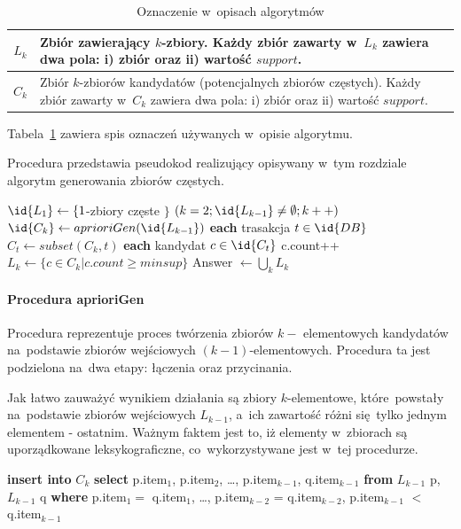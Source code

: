 \begin{table}
	\centering
	\begin{tabular}{c|p{7.7cm}}
	$L_k$ & Zbiór zawierający $k$-zbiory. Każdy zbiór zawarty w~$L_k$ zawiera dwa pola: i) zbiór oraz ii) wartość $support$. \\ \hline
	$C_k$ & Zbiór $k$-zbiorów kandydatów (potencjalnych zbiorów częstych). Każdy zbiór zawarty w~$C_k$ zawiera dwa pola: i) zbiór oraz ii) wartość $support$. \\ 
	\end{tabular}
	\caption{Oznaczenie w~opisach algorytmów\label{skroty:znaczanie}}
\end{table}

Tabela~\ref{skroty:znaczanie} zawiera spis oznaczeń używanych w~opisie algorytmu. 

Procedura  przedstawia pseudokod realizujący opisywany w~tym rozdziale algorytm generowania zbiorów częstych.

\begin{codebox}
	\label{apriori:listing}
	\li $\id{L_1} \gets \lbrace 1$-zbiory częste $\rbrace$
		\li \For $(k = 2; \id{L_{k-1}} \neq \emptyset; k++)$
		\li \Do
			 $\id{C_k} \gets aprioriGen(\id{L_{k-1}})$
			\li \For \textbf{each} trasakcja $t \in \id{DB}$
			\li \Do
					$C_t \gets subset(C_k, t)$
					\li \For \textbf{each} kandydat $c \in \id{C_t}$
					\li \Do c.count++
					\End
				\End
			\li $L_k \gets \lbrace c \in C_k | c.count \geq minsup \rbrace$	
		\End
	\li Answer $\gets \bigcup_k L_k $
\end{codebox}

\paragraph{Procedura aprioriGen\label{sec:apriori_gen}}
Procedura  reprezentuje proces twórzenia zbiorów $k-$ elementowych kandydatów na~podstawie zbiorów wejściowych $(k-1)$-elementowych. Procedura ta jest podzielona na~dwa etapy: łączenia oraz przycinania. 

Jak łatwo zauważyć wynikiem działania  są zbiory $k$-elementowe, które~powstały na~podstawie zbiorów wejściowych $L_{k-1}$, a~ich zawartość różni się~tylko jednym elementem - ostatnim. Ważnym faktem jest to, iż elementy w~zbiorach są uporządkowane leksykograficzne, co~wykorzystywane jest w~tej procedurze.

\begin{codebox}
	\li \textbf{insert into} $C_k$
	\li \textbf{select} p.item$_1$, p.item$_2$, \dots, p.item$_{k-1}$, q.item$_{k-1}$
	\li \textbf{from} $L_{k-1}$ p, $L_{k-1}$ q
	\li \textbf{where} p.item$_1 = $ q.item$_1$, \dots, p.item$_{k-2}$ = q.item$_{k-2}$, p.item$_{k-1}$ $<$ q.item$_{k-1}$
\end{codebox}

